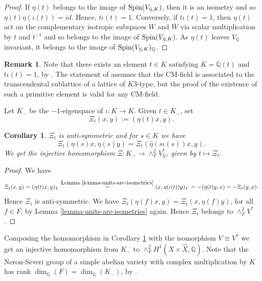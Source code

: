 \documentclass[12pt]{amsart}
\numberwithin{equation}{subsection}
\theoremstyle{plain}
\newtheorem{cor}[thm]{Corollary}
\theoremstyle{definition}
\newtheorem{rem}[thm]{Remark}
\newcommand{\QQ}{{\mathbb Q}}
\newcommand{\Spin}{{\rm Spin}}
\begin{document}
{\begin{proof}
If $\eta(t)$ belongs to the image of $\Spin(V_{\hat{\eta},K})$, then it is an isometry and so $\eta(t)\eta(\iota(t))=id$. Hence, $t\iota(t)=1$. Conversely, if 
$t\iota(t)=1$, then $\eta(t)$ act on the complementary isotropic subspaces $W$ and $\bar{W}$ via scalar multiplication by $t$ and $t^{-1}$ and so belongs to the image of 
$\Spin(V_{\hat{\eta},K})$. As $\eta(t)$ leaves $V_\QQ$ invariant, it belongs to the image of $\Spin(V_{\hat{\eta},K})_\QQ$.
\end{proof}

\begin{rem}
\label{rem-isometry-as-primitive-element}
Note that there exists an element $t\in K$ satisfying $K=\QQ(t)$ and $t\iota(t)=1$, by \cite[Theorem 3.7]{huybrechts-k3-book}. The statement of \cite[Theorem 3.7]{huybrechts-k3-book} assumes that the CM-field is associated to the transcendental sublattice of a lattice of $K3$-type, but the proof of the existence of such a primitive element is valid for any CM-field.
\end{rem}

Let $K_-$ be the $-1$-eigenspace of $\iota:K\rightarrow K$. Given $t\in K_-$, set
\begin{equation}
\label{eq-Xi-t}
\Xi_t(x,y):= (\eta(t)x,y).
\end{equation}

\begin{cor}
\label{cor-Neron-Severi-group}
$\Xi_t$ is anti-symmetric and for $s\in K$ we have
\[
\Xi_t(\eta(s)x,\eta(s)y)=\Xi_t(\hat{\eta}(s\iota(s))x,y).
\]
We get the injective
homomorphism $\Xi:K_-\rightarrow \wedge^2_FV^*_\QQ$, given by $t\mapsto \Xi_t.$
\end{cor}

\begin{proof} We have
\[
\Xi_t(x,y)=(\eta(t)x,y)_V\stackrel{\mbox{Lemma \ref{lemma-units-are-isometries}}}{=}
(x,\eta(\iota(t))y)_V=-(\eta(t)y,x)=-\Xi_t(y,x).
\]
Hence $\Xi_t$ is anti-symmetric. 
We have $\Xi_t(\eta(f)x,y)=\Xi_t(x,\eta(f)y)$, for all $f\in F$, by Lemma \ref{lemma-units-are-isometries} again.
Hence $\Xi_t$ belongs to $\wedge^2_FV^*$. 
\end{proof}

Composing the homomorphism in Corollary \ref{cor-Neron-Severi-group} 
with the isomorphism $V\cong V^*$ we get an injective homomorphism from $K_-$ to $\wedge^2_FH^1(X\times \hat{X},\QQ)$.
Note that the Neron-Severi group of a simple abelian variety with complex multiplication by $K$ has rank $\dim_\QQ(F)=\dim_\QQ(K_-)$, by \cite[Prop. 5.5.7]{BL}.

}
\end{document}
